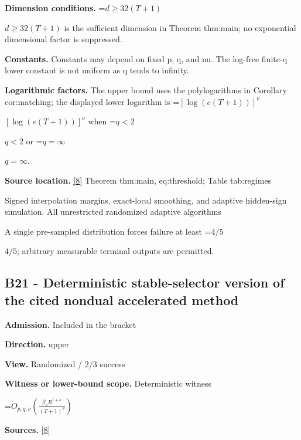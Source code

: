 \documentclass[10pt,a4paper]{article}
\newcommand{\AtlasMath}[1]{\par\begingroup\centering\setbox0=\hbox{$\displaystyle #1$}\ifdim\wd0>1.4\linewidth\typeout{ATLAS WIDE FORMULA: \the\wd0}\fi\ifdim\wd0>\linewidth\resizebox{\linewidth}{!}{\box0}\else\box0\fi\par\endgroup}
\newcommand{\AtlasInlineMath}[1]{\begingroup\setbox0=\hbox{$#1$}\ifdim\wd0>.4\linewidth\endgroup\AtlasMath{#1}\else\endgroup$#1$\fi}
\begin{document}
\textbf{Dimension conditions.} \AtlasInlineMath{d\ge32(T+1)} is the sufficient dimension in Theorem thm:main; no exponential dimensional factor is suppressed.



\textbf{Constants.} Constants may depend on fixed p, q, and nu. The log-free finite-q lower constant is not uniform as q tends to infinity.



\textbf{Logarithmic factors.} The upper bound uses the polylogarithms in Corollary cor:matching; the displayed lower logarithm is \AtlasInlineMath{[\log(e(T+1))]^\nu} when \AtlasInlineMath{q<2} or \AtlasInlineMath{q=\infty}.



\textbf{Source location.} \href{https://github.com/WU-Wendao/Colombo/blob/main/colombo_sensorium/Complexity_altas/data/sources/colombo/B1/manuscript.pdf}{[8]} Theorem thm:main, eq:threshold; Table tab:regimes



Signed interpolation margins, exact-local smoothing, and adaptive hidden-sign simulation. All unrestricted randomized adaptive algorithms



A single pre-sampled distribution forces failure at least \AtlasInlineMath{4/5}; arbitrary measurable terminal outputs are permitted.



\subsection{B21 - Deterministic stable-selector version of the cited nondual accelerated method}


\textbf{Admission.} Included in the bracket



\textbf{Direction.} upper



\textbf{View.} Randomized / 2/3 success



\textbf{Witness or lower-bound scope.} Deterministic witness



\AtlasMath{\widetilde O_{p,q,\nu}\!\left(\frac{\beta_\nu R^{1+\nu}}{(T+1)^a}\right)}


\textbf{Sources.} \href{https://github.com/WU-Wendao/Colombo/blob/main/colombo_sensorium/Complexity_altas/data/sources/colombo/B1/manuscript.pdf}{[8]}
\end{document}
